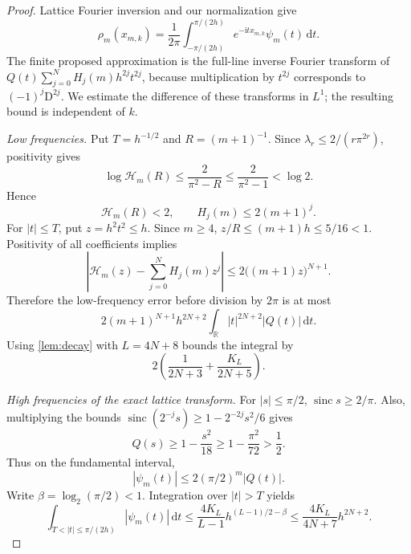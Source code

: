 \documentclass[11pt,a4paper]{article}
\numberwithin{equation}{section}
\theoremstyle{definition}
\newcommand{\R}{\mathbb R}
\newcommand{\dd}{\,\mathrm d}
\newcommand{\ii}{\mathrm i}
\newcommand{\D}{\mathrm D}
\newcommand{\sinc}{\operatorname{sinc}}
\begin{document}
\begin{proof}
Lattice Fourier inversion and our normalization give
\begin{equation}
 \rho_m(x_{m,k})=\frac1{2\pi}
 \int_{-\pi/(2h)}^{\pi/(2h)}e^{-\ii t x_{m,k}}\psi_m(t)\dd t.
 \label{eq:lattice-inversion}
\end{equation}
The finite proposed approximation is the full-line inverse Fourier
transform of
$Q(t)\sum_{j=0}^NH_j(m)h^{2j}t^{2j}$, because multiplication by
$t^{2j}$ corresponds to $(-1)^j\D^{2j}$.
We estimate the difference of these transforms in $L^1$; the resulting
bound is independent of $k$.

\emph{Low frequencies.}
Put $T=h^{-1/2}$ and $R=(m+1)^{-1}$. Since
$\lambda_r\leq2/(r\pi^{2r})$, positivity gives
\begin{equation}
 \log\mathcal H_m(R)
 \leq\frac2{\pi^2-R}\leq\frac2{\pi^2-1}<\log2.
\end{equation}
Hence
\begin{equation}
 \mathcal H_m(R)<2,
 \qquad H_j(m)\leq2(m+1)^j.
 \label{eq:H-coeff-bound}
\end{equation}
For $|t|\leq T$, put $z=h^2t^2\leq h$. Since $m\geq4$,
$z/R\leq(m+1)h\leq5/16<1$. Positivity of all coefficients implies
\begin{equation}
 \left|\mathcal H_m(z)-\sum_{j=0}^NH_j(m)z^j\right|
 \leq2\bigl((m+1)z\bigr)^{N+1}.
 \label{eq:H-remainder}
\end{equation}
Therefore the low-frequency error before division by $2\pi$ is at most
\begin{equation}
 2(m+1)^{N+1}h^{2N+2}
       \int_{\R}|t|^{2N+2}|Q(t)|\dd t.
 \label{eq:low-error}
\end{equation}
Using \cref{lem:decay} with $L=4N+8$ bounds the integral by
\begin{equation}
 2\left(\frac1{2N+3}+\frac{K_L}{2N+5}\right).
 \label{eq:weighted-integral-bound}
\end{equation}

\emph{High frequencies of the exact lattice transform.}
For $|s|\leq\pi/2$, $\sinc s\geq2/\pi$. Also, multiplying the
bounds $\sinc(2^{-j}s)\geq1-2^{-2j}s^2/6$ gives
\begin{equation}
 Q(s)\geq1-\frac{s^2}{18}\geq1-\frac{\pi^2}{72}>\frac12.
\end{equation}
Thus on the fundamental interval,
\begin{equation}
 |\psi_m(t)|\leq2(\pi/2)^m|Q(t)|.
\end{equation}
Write $\beta=\log_2(\pi/2)<1$. Integration over $|t|>T$ yields
\begin{equation}
 \int_{T<|t|\leq\pi/(2h)}|\psi_m(t)|\dd t
 \leq\frac{4K_L}{L-1}h^{(L-1)/2-\beta}
 \leq\frac{4K_L}{4N+7}h^{2N+2}.
 \label{eq:psi-tail-bound}
\end{equation}


\end{proof}
\end{document}
